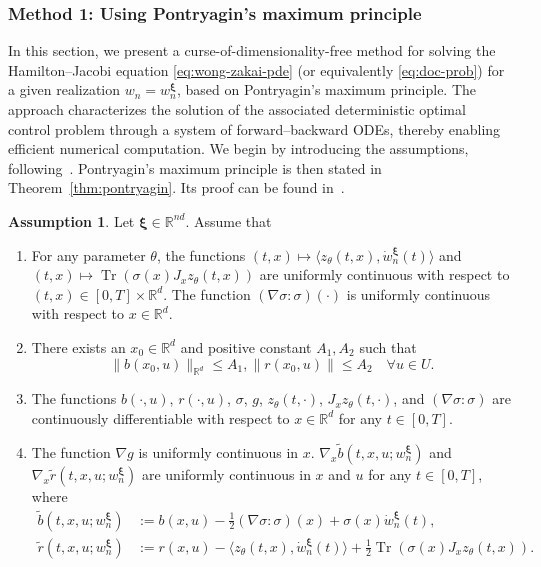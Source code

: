 \documentclass[11pt]{article}
\numberwithin{equation}{section}
\theoremstyle{plain}
\theoremstyle{definition}
\newtheorem{assumption}{Assumption}
\theoremstyle{remark}
\newcommand{\op}{\operatorname}
\newcommand{\R}{\mathbb{R}}
\begin{document}
\subsubsection{Method 1: Using Pontryagin's maximum principle}
\label{sec:pontryagin-method}
In this section, we present a curse-of-dimensionality-free method for solving the Hamilton--Jacobi equation \eqref{eq:wong-zakai-pde} (or equivalently \eqref{eq:doc-prob}) for a given realization $w_n = w_n^{\bm{\xi}}$, based on Pontryagin’s maximum principle. The approach characterizes the solution of the associated deterministic optimal control problem through a system of forward–backward ODEs, thereby enabling efficient numerical computation. We begin by introducing the assumptions, following~\cite[Section 3.2]{yong1999stochastic}. Pontryagin’s maximum principle is then stated in Theorem~\ref{thm:pontryagin}. Its proof can be found in~\cite[Section 3.2]{yong1999stochastic}. 

\begin{assumption} \label{assu:Pontryagin}
Let $\bm{\xi}\in \R^{nd}$. Assume that 
\begin{enumerate}
    \item For any parameter $\theta$, the functions $(t,x)\mapsto \langle z_\theta(t,x), \dot{w}_n^{\bm{\xi}}(t)\rangle$ and $(t,x)\mapsto \op{Tr}(\sigma(x)J_xz_\theta(t,x))$ are uniformly continuous with respect to $(t,x)\in [0,T]\times \R^d$. The function $(\nabla \sigma:\sigma)(\cdot)$ is uniformly continuous with respect to $x\in \R^d$.
    \item There exists an $x_0\in \R^d$ and positive constant $A_1, A_2$ such that 
    \begin{equation*}
        \|b(x_0,u)\|_{\R^d} \le A_1, \|r(x_0,u)\|\le A_2  \quad \forall u\in U.
    \end{equation*}
    \item The functions $b(\cdot, u)$, $r(\cdot,u)$, $\sigma$, $g$, $z_\theta(t,\cdot)$, $J_xz_\theta(t,\cdot)$, and $(\nabla \sigma:\sigma)$ are continuously differentiable with respect to $x\in \R^d$ for any $t\in [0,T]$. 
    \item The function $\nabla g$ is uniformly continuous in $x$. $\nabla_x \tilde{b}(t,x,u; w_n^{\bm{\xi}})$ and $\nabla_x \tilde{r}(t,x,u; w_n^{\bm{\xi}})$ are uniformly continuous in $x$ and $u$ for any $t\in [0,T]$, where 
    \begin{equation} \label{eq:defi-tilde-b-r}
    \begin{aligned}
        \tilde{b}(t,x,u; w_n^{\bm{\xi}}) &:= b(x, u) - \frac{1}{2}(\nabla \sigma:\sigma)(x) + \sigma(x) \dot{w}_n^{\bm{\xi}}(t), \\
        \tilde{r}(t,x,u; w_n^{\bm{\xi}}) &:= r(x, u) - \langle z_\theta(t, x), \dot{w}_n^{\bm{\xi}}(t)\rangle + \frac{1}{2}\op{Tr}\left( \sigma(x) J_x z_\theta(t, x) \right). 
    \end{aligned}
    \end{equation}
\end{enumerate}
\end{assumption}
\end{document}
